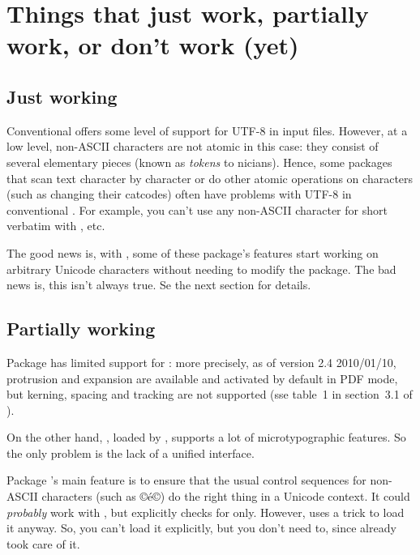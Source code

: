 \documentclass{lltxdoc}
\begin{document}

\section{Things that just work, partially work, or don't work (yet)}
\label{workornot}

\subsection{Just working}\label{working}

Conventional \latex offers some level of support for UTF-8 in input files.
However, at a low level, non-ASCII characters are not atomic in this case:
they consist of several elementary pieces (known as \emph{tokens} to
\tex{}nicians). Hence, some packages that scan text character by character or
do other atomic operations on characters (such as changing their catcodes)
often have problems with UTF-8 in conventional \latex. For example, you can't
use any non-ASCII character for short verbatim with , etc.

The good news is, with \lualatex, some of these package's features start
working on arbitrary Unicode characters without needing to modify the package.
The bad news is, this isn't always true. Se the next section for details.

\subsection{Partially working}\label{partial}

Package  has limited support for \luatex: more precisely, as of
version 2.4 2010/01/10, protrusion and expansion are available and activated
by default in PDF mode, but kerning, spacing and tracking are not supported
(sse table~1 in section~3.1 of ).

On the other hand, , loaded by , supports a lot of
microtypographic features. So the only problem is the lack of a unified
interface.

Package 's main feature is to ensure that the usual control
sequences for non-ASCII characters (such as ©\'e©) do the right thing in a
Unicode context. It could \emph{probably} work with \luatex, but explicitly
checks for \xetex only. However,  uses a trick to load it anyway.
So, you can't load it explicitly, but you don't need to, since 
already took care of it.
\end{document}
